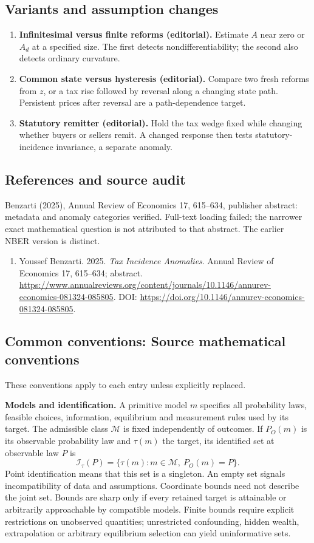 \documentclass[11pt,a4paper]{article}
\begin{document}
\subsection*{Variants and assumption changes}
\begin{enumerate}
\item \textbf{Infinitesimal versus finite reforms (editorial).} Estimate \(A\) near zero or \(A_d\) at a specified size. The first detects nondifferentiability; the second also detects ordinary curvature.
\item \textbf{Common state versus hysteresis (editorial).} Compare two fresh reforms from \(z\), or a tax rise followed by reversal along a changing state path. Persistent prices after reversal are a path-dependence target.
\item \textbf{Statutory remitter (editorial).} Hold the tax wedge fixed while changing whether buyers or sellers remit. A changed response then tests statutory-incidence invariance, a separate anomaly.
\end{enumerate}
\subsection*{References and source audit}
Benzarti (2025), Annual Review of Economics 17, 615--634, publisher abstract: metadata and anomaly categories verified. Full-text loading failed; the narrower exact mathematical question is not attributed to that abstract. The earlier NBER version is distinct.
\begin{enumerate}\raggedright
\item\hypertarget{definitions:source:30007758:1}{} Youssef Benzarti. 2025. \emph{Tax Incidence Anomalies}. Annual Review of Economics 17, 615–634; abstract.
\url{https://www.annualreviews.org/content/journals/10.1146/annurev-economics-081324-085805}.
DOI: \url{https://doi.org/10.1146/annurev-economics-081324-085805}.
\end{enumerate}

\subsection*{Common conventions: Source mathematical conventions}

These conventions apply to each entry unless explicitly replaced.

\textbf{Models and identification.} A primitive model \(m\) specifies all probability laws, feasible choices, information, equilibrium and measurement rules used by its target. The admissible class \(\mathcal M\) is fixed independently of outcomes. If \(P_O(m)\) is its observable probability law and \(\tau(m)\) the target, its identified set at observable law \(P\) is
\[
 \mathcal I_\tau(P)=\{\tau(m):m\in\mathcal M,\ P_O(m)=P\}.
\]
Point identification means that this set is a singleton. An empty set signals incompatibility of data and assumptions. Coordinate bounds need not describe the joint set. Bounds are sharp only if every retained target is attainable or arbitrarily approachable by compatible models. Finite bounds require explicit restrictions on unobserved quantities; unrestricted confounding, hidden wealth, extrapolation or arbitrary equilibrium selection can yield uninformative sets.
\end{document}
